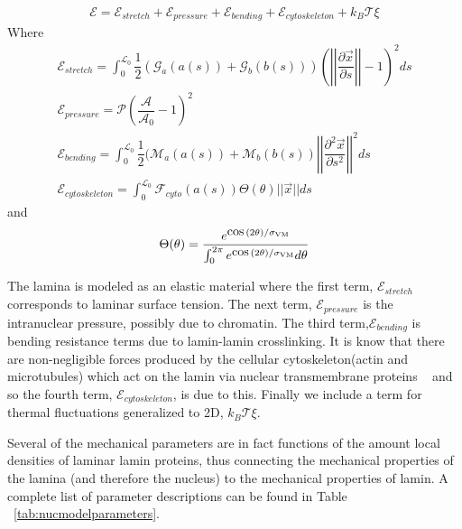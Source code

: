 \begin{align}
\mathcal{E} = \mathcal{E}_{stretch} + \mathcal{E}_{pressure} +\mathcal{E}_{bending} + \mathcal{E}_{cytoskeleton} + k_B\mathcal{T} \xi
\end{align}
Where 
\begin{align}
\mathcal{E}_{stretch} = \displaystyle \int_0^{\mathcal{L}_0} \dfrac{1}{2} (\mathcal{G}_a(a(s)) +\mathcal{G}_b(b(s)) )\left( \left |\left| \dfrac{\partial \vec{x} }{\partial s} \right|\right| - 1\right)^2 ds \\
\mathcal{E}_{pressure}  = \mathcal{P} \left( \dfrac{\mathcal{A}}{\mathcal{A}_0} -1\right)^2  \\
\mathcal{E}_{bending} = \displaystyle\int_0^{\mathcal{L}_0} \dfrac{1}{2 } (\mathcal{M}_a(a(s)) + \mathcal{M}_b (b(s)) \left|\left| \dfrac{\partial^2 \vec{x}}{\partial s^2} \right|\right|^2 ds\\
\mathcal{E}_{cytoskeleton} = \displaystyle\int_0^{\mathcal{L}_0} \mathcal{F}_{cyto} (a(s))\Theta (\theta) || \vec{x} || ds 
\end{align}
and \[ \Theta (\theta) = \dfrac{e^{\cos(2\theta)/\sigma_{\rm VM }}}{\int_0^{ 2\pi} e^{\cos(2\theta)/\sigma_{\rm VM}}d \theta} \]

The lamina is modeled as an elastic material where the first term, $\mathcal{E}_{stretch}$ corresponds to laminar surface tension. The next term, $\mathcal{E}_{pressure}$ is the intranuclear pressure, possibly due to chromatin. The third term,$\mathcal{E}_{bending}$  is bending resistance terms due to lamin-lamin crosslinking. It is know that there are non-negligible forces produced by the cellular cytoskeleton(actin and microtubules) which act on the lamin via nuclear transmembrane proteins ~\cite{Haque2010} and so the fourth term, $\mathcal{E}_{cytoskeleton}$, is due to this. Finally we include a term for thermal fluctuations generalized to 2D, $k_B\mathcal{T} \xi$. 


Several of the mechanical parameters are in fact functions of the amount local densities of laminar lamin proteins, thus connecting the mechanical properties of the lamina (and therefore the nucleus) to the mechanical properties of lamin. A complete list of parameter descriptions can be found in Table ~\ref{tab:nucmodelparameters}.


